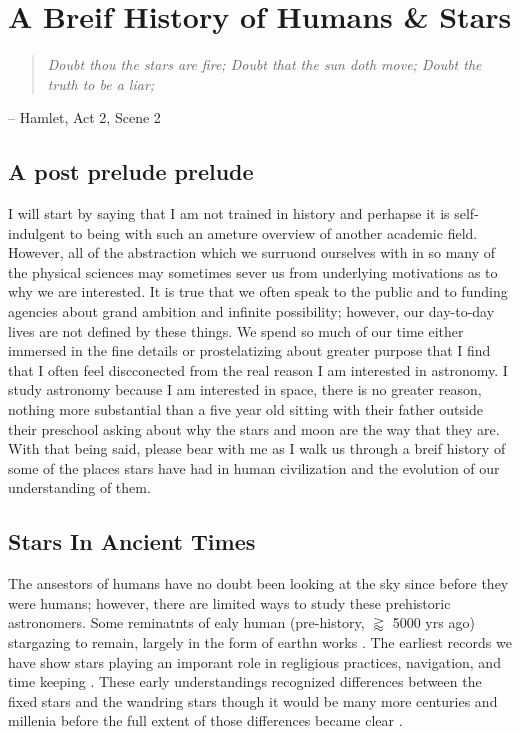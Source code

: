 \chapter{A Breif History of Humans \& Stars}
\begin{quote}\em
  Doubt thou the stars are fire;
  Doubt that the sun doth move;
  Doubt the truth to be a liar;
\end{quote}
\begin{flushright}
-- Hamlet, Act 2, Scene 2
\end{flushright}
\section{A post prelude prelude}
I will start by saying that I am not trained in history and perhapse it is
self-indulgent to being with such an ameture overview of another academic
field. However, all of the abstraction which we surruond ourselves with in so
many of the physical sciences may sometimes sever us from underlying
motivations as to why we are interested. It is true that we often speak to the
public and to funding agencies about grand ambition and infinite possibility;
however, our day-to-day lives are not defined by these things. We spend so much
of our time either immersed in the fine details or prostelatizing about greater
purpose that I find that I often feel discconected from the real reason I am
interested in astronomy. I study astronomy because I am interested in space,
there is no greater reason, nothing more substantial than a five year old
sitting with their father outside their preschool asking about why the stars
and moon are the way that they are. With that being said, please bear with me
as I walk us through a breif history of some of the places stars have had in
human civilization and the evolution of our understanding of them.


\section{Stars In Ancient Times}
The ansestors of humans have no doubt been looking at the sky since before they
were humans; however, there are limited ways to study these prehistoric
astronomers. Some reminatnts of ealy human (pre-history, $\gtrapprox$ 5000 yrs
ago) stargazing to remain, largely in the form of earthn works \addcite. The
earliest records we have show stars playing an imporant role in regligious
practices, navigation, and time keeping \addcite. These early understandings
recognized differences between the fixed stars and the wandring stars though
it would be many more centuries and millenia before the full extent of those
differences became clear \addcite.

